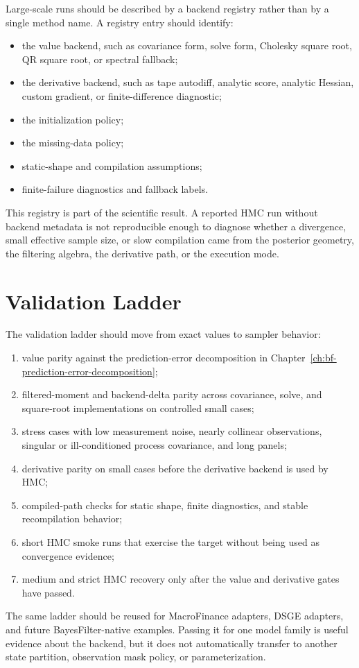 Large-scale runs should be described by a backend registry rather than by a
single method name.  A registry entry should identify:
\begin{itemize}
  \item the value backend, such as covariance form, solve form, Cholesky
    square root, QR square root, or spectral fallback;
  \item the derivative backend, such as tape autodiff, analytic score,
    analytic Hessian, custom gradient, or finite-difference diagnostic;
  \item the initialization policy;
  \item the missing-data policy;
  \item static-shape and compilation assumptions;
  \item finite-failure diagnostics and fallback labels.
\end{itemize}
This registry is part of the scientific result.  A reported HMC run without
backend metadata is not reproducible enough to diagnose whether a divergence,
small effective sample size, or slow compilation came from the posterior
geometry, the filtering algebra, the derivative path, or the execution mode.

\section{Validation Ladder}
\label{sec:bf-lgssm-validation-ladder}

The validation ladder should move from exact values to sampler behavior:
\begin{enumerate}[label=(\roman*)]
  \item value parity against the prediction-error decomposition in
    Chapter~\ref{ch:bf-prediction-error-decomposition};
  \item filtered-moment and backend-delta parity across covariance, solve, and
    square-root implementations on controlled small cases;
  \item stress cases with low measurement noise, nearly collinear observations,
    singular or ill-conditioned process covariance, and long panels;
  \item derivative parity on small cases before the derivative backend is used
    by HMC;
  \item compiled-path checks for static shape, finite diagnostics, and stable
    recompilation behavior;
  \item short HMC smoke runs that exercise the target without being used as
    convergence evidence;
  \item medium and strict HMC recovery only after the value and derivative
    gates have passed.
\end{enumerate}
The same ladder should be reused for MacroFinance adapters, DSGE adapters, and
future BayesFilter-native examples.  Passing it for one model family is useful
evidence about the backend, but it does not automatically transfer to another
state partition, observation mask policy, or parameterization.

